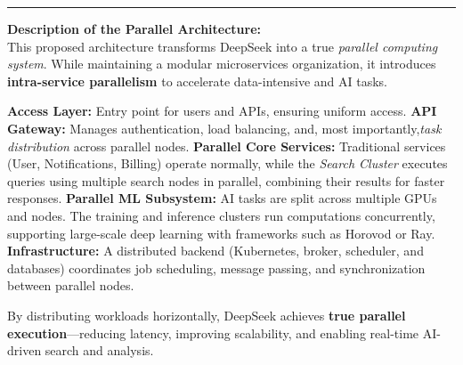 \documentclass[a4paper,10pt]{article}
\begin{document}
\begin{center}
\begin{tikzpicture}[node distance=0.9cm and 1.3cm]
\end{tikzpicture}
\end{center}

\vspace{0.5cm}
\noindent\rule{\textwidth}{0.4pt}

\begin{minipage}{\textwidth}
\small
\textbf{Description of the Parallel Architecture:}\\[0.3em]
This proposed architecture transforms DeepSeek into a true \textit{parallel computing system}.  
While maintaining a modular microservices organization, it introduces \textbf{intra-service parallelism} to accelerate data-intensive and AI tasks.

\textbf{Access Layer:} Entry point for users and APIs, ensuring uniform access.  
\textbf{API Gateway:} Manages authentication, load balancing, and, most importantly,\textit{task distribution} across parallel nodes.  
\textbf{Parallel Core Services:} Traditional services (User, Notifications, Billing) operate normally, while the \textit{Search Cluster} executes queries using multiple search nodes in parallel, combining their results for faster responses.  
\textbf{Parallel ML Subsystem:} AI tasks are split across multiple GPUs and nodes. The training and inference clusters run computations concurrently, supporting large-scale deep learning with frameworks such as Horovod or Ray.  
\textbf{Infrastructure:} A distributed backend (Kubernetes, broker, scheduler, and databases) coordinates job scheduling, message passing, and synchronization between parallel nodes.

By distributing workloads horizontally, DeepSeek achieves \textbf{true parallel execution}—reducing latency, improving scalability, and enabling real-time AI-driven search and analysis.
\end{minipage}
\end{document}

